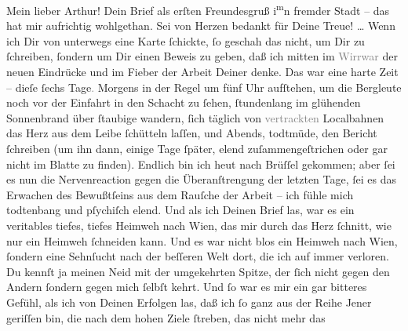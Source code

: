 \pstart\center{}Mein lieber Arthur!\pend\vspace{0.5em}
\pstart
           Dein Brief als erſten Freundesgruß i\substVorne{}\textsuperscript{m}\substDazwischen{}n\substHinten{} fremder Stadt – das
               hat mir aufrichtig wohlgethan. Sei von Herzen bedankt für Deine Treue! {\dots} Wenn ich Dir von unterwegs eine Karte ſchickte, ſo
               geschah das nicht, um Dir zu ſchreiben, ſondern um Dir einen Beweis zu geben, daß ich
               mitten im \textcolor{gray}{Wirrwar} der neuen Eindrücke und im Fieber der Arbeit
               Deiner denke. Das war eine harte Zeit – dieſe ſechs Tage\textcolor{gray}{.} Morgens
               in der Regel um fünf Uhr aufſtehen, um die Bergleute noch vor der Einfahrt in den
               Schacht zu ſehen, ſtundenlang im glühenden Sonnenbrand über ſtaubige \label{K_L02663-1v}\label{K_L02663-1} wandern,
               ſich täglich von \textcolor{gray}{vertrackten} Localbahnen das Herz aus dem Leibe
               ſchütteln laſſen, und Abends, todtmüde, den Bericht ſchreiben (um ihn dann\strikeout{)}, einige Tage ſpäter, elend zuſammengeſtrichen oder
               gar nicht im Blatte zu
               finden). Endlich  bin ich heut nach Brüſſel gekommen; aber ſei es nun die Nervenreaction gegen die
               Überanſtrengung der letzten Tage, ſei es das Erwachen des Bewußtſeins aus dem Rauſche
               der Arbeit – ich fühle mich todtenbang und pſychiſch elend. Und als ich Deinen Brief
               las, war es ein veritables tiefes, tiefes Heimweh nach Wien, das mir durch das Herz ſchnitt, {\pb}wie
               nur ein Heimweh ſchneiden kann. Und es war nicht blos ein Heimweh nach Wien, ſondern eine Sehnſucht nach der beſſeren Welt
               dort, die ich auf immer verloren. Du kennſt ja meinen Neid mit der umgekehrten
               Spitze, der ſich nicht gegen den Andern ſondern gegen mich ſelbſt kehrt. Und ſo war
               es mir ein gar bitteres Gefühl, als ich von Deinen Erfolgen las, daß ich ſo ganz aus
               der Reihe Jener geriſſen bin, die nach dem hohen Ziele ſtreben, das nicht mehr das
